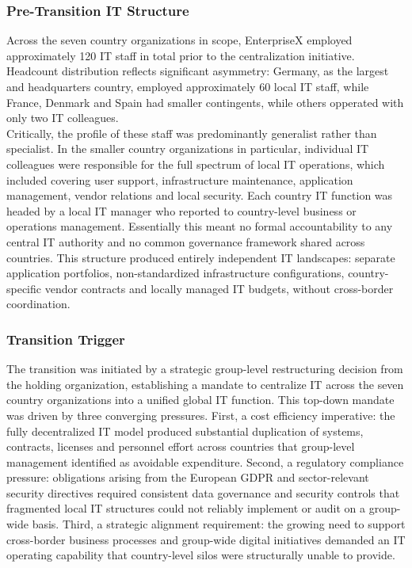\subsubsection{Pre-Transition IT Structure}
\label{subsubsec:PreTransitionITStructure}
Across the seven country organizations in scope, EnterpriseX employed approximately 120 IT staff in total prior to the centralization initiative.
Headcount distribution reflects significant asymmetry: Germany, as the largest and headquarters country, employed approximately 60 local IT staff, while France, Denmark and Spain had smaller contingents, while others opperated with only two IT colleagues.
\\
Critically, the profile of these staff was predominantly generalist rather than specialist.
In the smaller country organizations in particular, individual IT colleagues were responsible for the full spectrum of local IT operations, which included covering user support, infrastructure maintenance, application management, vendor relations and local security.
Each country IT function was headed by a local IT manager who reported to country-level business or operations management.
Essentially this meant no formal accountability to any central IT authority and no common governance framework shared across countries.
This structure produced entirely independent IT landscapes: separate application portfolios, non-standardized infrastructure configurations, country-specific vendor contracts and locally managed IT budgets, without cross-border coordination.
\subsubsection{Transition Trigger}
\label{subsubsec:TransitionTrigger}
The transition was initiated by a strategic group-level restructuring decision from the holding organization, establishing a mandate to centralize IT across the seven country organizations into a unified global IT function.
This top-down mandate was driven by three converging pressures.
First, a cost efficiency imperative: the fully decentralized IT model produced substantial duplication of systems, contracts, licenses and personnel effort across countries that group-level management identified as avoidable expenditure.
Second, a regulatory compliance pressure: obligations arising from the European \ac{GDPR} and sector-relevant security directives required consistent data governance and security controls that fragmented local IT structures could not reliably implement or audit on a group-wide basis.
Third, a strategic alignment requirement: the growing need to support cross-border business processes and group-wide digital initiatives demanded an IT operating capability that country-level silos were structurally unable to provide.

